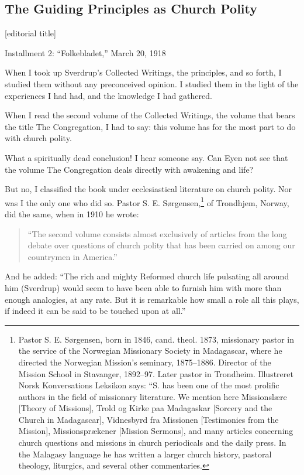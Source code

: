 

\subsection{The Guiding Principles as Church Polity}
[editorial title]

Installment 2: “Folkebladet,” March 20, 1918

When I took up Sverdrup’s Collected Writings, the principles, and so forth, I studied them without any preconceived opinion. I studied them in the light of the experiences I had had, and the knowledge I had gathered.

When I read the second volume of the Collected Writings, the volume that bears the title The Congregation, I had to say: this volume has for the most part to do with church polity.

What a spiritually dead conclusion! I hear someone say. Can Eyen not see that the volume The Congregation deals directly with awakening and life?

But no, I classified the book under ecclesiastical literature on church polity. Nor was I the only one who did so. Pastor S. E. Sørgensen,\footnote{Pastor S. E. Sørgensen, born in 1846, cand. theol. 1873, missionary pastor in the service of the Norwegian Missionary Society in Madagascar, where he directed the Norwegian Mission’s seminary, 1875–1886. Director of the Mission School in Stavanger, 1892–97. Later pastor in Trondheim. Illustreret Norsk Konversations Leksikon says: “S. has been one of the most prolific authors in the field of missionary literature. We mention here Missionslære [Theory of Missions], Trold og Kirke paa Madagaskar [Sorcery and the Church in Madagascar], Vidnesbyrd fra Missionen [Testimonies from the Mission], Missionsprækener [Mission Sermons], and many articles concerning church questions and missions in church periodicals and the daily press. In the Malagasy language he has written a larger church history, pastoral theology, liturgics, and several other commentaries.} of Trondhjem, Norway, did the same, when in 1910 he wrote:

\begin{quote}
“The second volume consists almost exclusively of articles from the long debate over questions of church polity that has been carried on among our countrymen in America.”
\end{quote}

And he added: “The rich and mighty Reformed church life pulsating all around him (Sverdrup) would seem to have been able to furnish him with more than enough analogies, at any rate. But it is remarkable how small a role all this plays, if indeed it can be said to be touched upon at all.”

